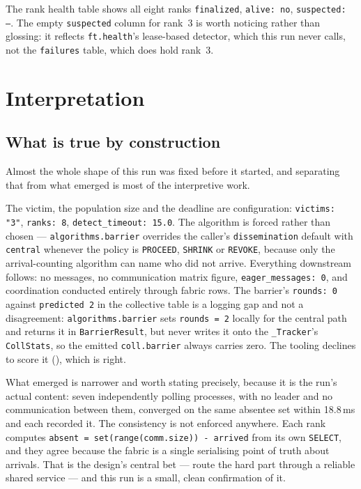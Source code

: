 \documentclass[11pt]{article}
\begin{document}
The rank health table shows all eight ranks \texttt{finalized}, \texttt{alive: no},
\texttt{suspected: --}. The empty \texttt{suspected} column for rank~3 is worth noticing
rather than glossing: it reflects \texttt{ft.health}'s lease-based detector, which this
run never calls, not the \texttt{failures} table, which does hold rank~3.

\section{Interpretation}

\subsection{What is true by construction}

Almost the whole shape of this run was fixed before it started, and separating that from
what emerged is most of the interpretive work.

The victim, the population size and the deadline are configuration:
\texttt{victims: "3"}, \texttt{ranks: 8}, \texttt{detect\_timeout: 15.0}. The algorithm is
forced rather than chosen --- \texttt{algorithms.barrier} overrides the caller's
\texttt{dissemination} default with \texttt{central} whenever the policy is
\texttt{PROCEED}, \texttt{SHRINK} or \texttt{REVOKE}, because only the arrival-counting
algorithm can name who did not arrive. Everything downstream follows: no messages, no
communication matrix figure, \texttt{eager\_messages: 0}, and coordination conducted
entirely through fabric rows. The barrier's \texttt{rounds: 0} against
\texttt{predicted 2} in the collective table is a logging gap and not a disagreement:
\texttt{algorithms.barrier} sets \texttt{rounds = 2} locally for the central path and
returns it in \texttt{BarrierResult}, but never writes it onto the \texttt{\_Tracker}'s
\texttt{CollStats}, so the emitted \texttt{coll.barrier} always carries zero. The tooling
declines to score it (\modelna{}), which is right.

What emerged is narrower and worth stating precisely, because it is the run's actual
content: seven independently polling processes, with no leader and no communication
between them, converged on the same absentee set within 18.8\,ms and each recorded it.
The consistency is not enforced anywhere. Each rank computes
\texttt{absent = set(range(comm.size)) - arrived} from its own \texttt{SELECT}, and they
agree because the fabric is a single serialising point of truth about arrivals. That is
the design's central bet --- route the hard part through a reliable shared service ---
and this run is a small, clean confirmation of it.
\end{document}
